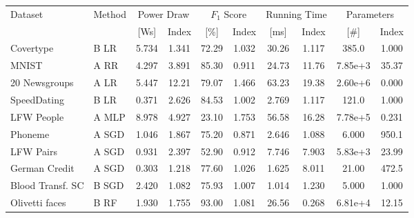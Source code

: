 
    \begin{tabular}{l|l|c|c|c|c|c|c|c|c}
        \toprule 
        \multirow{2}{*}{Dataset} & \multirow{2}{*}{Method}  & \multicolumn{2}{c}{Power Draw} & \multicolumn{2}{c}{$F_1$ Score} & \multicolumn{2}{c}{Running Time} & \multicolumn{2}{c}{Parameters}  \\  \cline{3-10}
        & & [Ws] & Index & [\%] & Index & [ms] & Index & [\#] & Index \\ 
        \midrule
        Covertype & \colorbox{RB}{B} LR & 5.734 & \colorbox{RB}{1.341} & 72.29 & \colorbox{RC}{1.032} & 30.26 & \colorbox{RB}{1.117} & 385.0 & \colorbox{RC}{1.000} \\
        MNIST & \colorbox{RA}{A} RR & 4.297 & \colorbox{RA}{3.891} & 85.30 & \colorbox{RD}{0.911} & 24.73 & \colorbox{RA}{11.76} & 7.85e+3 & \colorbox{RB}{35.37} \\
        20 Newsgroups & \colorbox{RA}{A} LR & 5.447 & \colorbox{RA}{12.21} & 79.07 & \colorbox{RA}{1.466} & 63.23 & \colorbox{RA}{19.38} & 2.60e+6 & \colorbox{RE}{0.000} \\
        SpeedDating & \colorbox{RB}{B} LR & 0.371 & \colorbox{RA}{2.626} & 84.53 & \colorbox{RC}{1.002} & 2.769 & \colorbox{RB}{1.117} & 121.0 & \colorbox{RC}{1.000} \\
        LFW People & \colorbox{RA}{A} MLP & 8.978 & \colorbox{RA}{4.927} & 23.10 & \colorbox{RA}{1.753} & 56.58 & \colorbox{RA}{16.28} & 7.78e+5 & \colorbox{RD}{0.231} \\
        Phoneme & \colorbox{RA}{A} SGD & 1.046 & \colorbox{RA}{1.867} & 75.20 & \colorbox{RD}{0.871} & 2.646 & \colorbox{RB}{1.088} & 6.000 & \colorbox{RA}{950.1} \\
        LFW Pairs & \colorbox{RA}{A} SGD & 0.931 & \colorbox{RA}{2.397} & 52.90 & \colorbox{RD}{0.912} & 7.746 & \colorbox{RA}{7.903} & 5.83e+3 & \colorbox{RB}{23.99} \\
        German Credit & \colorbox{RA}{A} SGD & 0.303 & \colorbox{RB}{1.218} & 77.60 & \colorbox{RC}{1.026} & 1.625 & \colorbox{RA}{8.011} & 21.00 & \colorbox{RA}{472.5} \\
        Blood Transf. SC & \colorbox{RB}{B} SGD & 2.420 & \colorbox{RB}{1.082} & 75.93 & \colorbox{RC}{1.007} & 1.014 & \colorbox{RB}{1.230} & 5.000 & \colorbox{RC}{1.000} \\
        Olivetti faces & \colorbox{RB}{B} RF & 1.930 & \colorbox{RA}{1.755} & 93.00 & \colorbox{RB}{1.081} & 26.56 & \colorbox{RD}{0.268} & 6.81e+4 & \colorbox{RB}{12.15} \\
        \bottomrule
    \end{tabular}